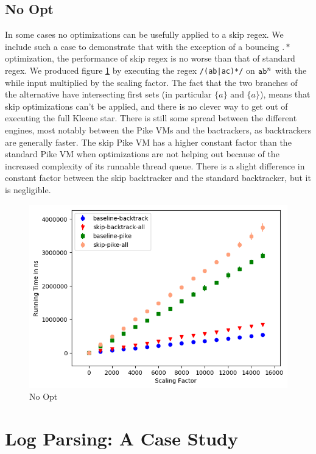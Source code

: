 \subsection{No Opt}
\label{section:noopt}

In some cases no optimizations can be usefully applied to a skip
regex. We include such a case to demonstrate that with the exception
of a bouncing $.*$ optimization, the performance of skip regex is
no worse than that of standard regex. We produced figure 
\ref{fig:justtwo:branch}
by executing the regex \verb'/(ab|ac)*/' on ${\tt ab}^n$ with
the while input multiplied by the scaling factor. The fact that the
two branches of the alternative have intersecting first sets
(in particular $\{a\}$ and $\{a\}$), means that skip optimizations
can't be applied, and there is no clever way to get out of
executing the full Kleene star. There is still some spread between
the different engines, most notably between the Pike VMs and the
bactrackers, as backtrackers are generally faster. The skip Pike VM
has a higher constant factor than the standard Pike VM when optimizations
are not helping out because of the increased complexity of its runnable
thread queue. There is a slight difference in constant factor between
the skip backtracker and the standard backtracker, but it is negligible.

\begin{figure}
\caption{No Opt}
\label{fig:justtwo:branch}

\includegraphics{resources/no-opt.png}
\end{figure}

\section{Log Parsing: A Case Study}
\label{section:logparsingcase}

